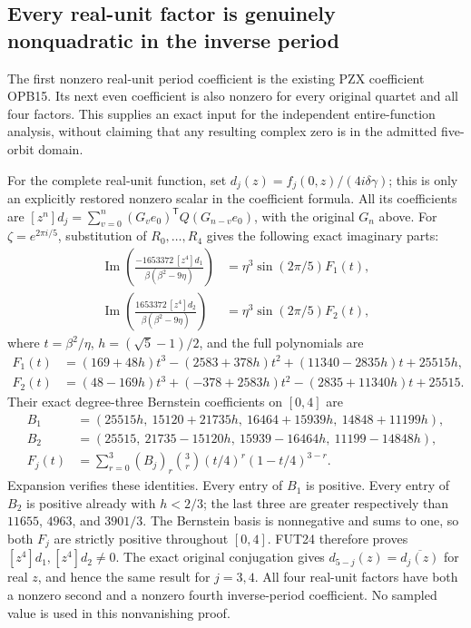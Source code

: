 \subsection{Every real-unit factor is genuinely nonquadratic in the inverse period}
The first nonzero real-unit period coefficient is the existing PZX
coefficient OPB15. Its next even coefficient is also nonzero for every
original quartet and all four factors. This supplies an exact input
for the independent entire-function analysis, without claiming that
any resulting complex zero is in the admitted five-orbit domain.

For the complete real-unit function, set
$d_j(z)=f_j(0,z)/(4i\delta\gamma)$; this is only an explicitly
restored nonzero scalar in the coefficient formula. All its coefficients
are $[z^n]d_j=\sum_{v=0}^n(G_ve_0)^{\mathsf T}Q(G_{n-v}e_0)$,
with the original $G_n$ above. For $\zeta=e^{2\pi i/5}$, substitution
of $R_0,\ldots,R_4$ gives the following exact imaginary parts:
\[
 \begin{split}
 \operatorname{Im}\left(
   \frac{-1653372\,[z^4]d_1}{\beta(\beta^2-9\eta)}\right)
 &=\eta^3\sin(2\pi/5)F_1(t),\\
 \operatorname{Im}\left(
   \frac{1653372\,[z^4]d_2}{\beta(\beta^2-9\eta)}\right)
 &=\eta^3\sin(2\pi/5)F_2(t),
 \end{split}\tag{FUT24}
\]
where $t=\beta^2/\eta$, $h=(\sqrt5-1)/2$, and the full polynomials are
\[
 \begin{split}
 F_1(t)&=(169+48h)t^3-(2583+378h)t^2
                 +(11340-2835h)t+25515h,\\
 F_2(t)&=(48-169h)t^3+(-378+2583h)t^2
                 -(2835+11340h)t+25515.
 \end{split}\tag{FUT25}
\]
Their exact degree-three Bernstein coefficients on $[0,4]$ are
\[
 \begin{split}
 B_1&=(25515h,\ 15120+21735h,\ 16464+15939h,\ 14848+11199h),\\
 B_2&=(25515,\ 21735-15120h,\ 15939-16464h,\ 11199-14848h),\\
 F_j(t)&=\sum_{r=0}^3(B_j)_r\binom3r(t/4)^r(1-t/4)^{3-r}.
 \end{split}\tag{FUT26}
\]
Expansion verifies these identities. Every entry of $B_1$ is positive.
Every entry of $B_2$ is positive already with $h<2/3$; the last three
are greater respectively than $11655$, $4963$, and $3901/3$.
The Bernstein basis is nonnegative and sums to one, so both $F_j$
are strictly positive throughout $[0,4]$.
FUT24 therefore proves $[z^4]d_1,[z^4]d_2\ne0$.
The exact original conjugation gives $d_{5-j}(z)=\overline{d_j(z)}$
for real $z$, and hence the same result for $j=3,4$.
All four real-unit factors have both a nonzero second and a nonzero
fourth inverse-period coefficient. No sampled value is used in this
nonvanishing proof.
